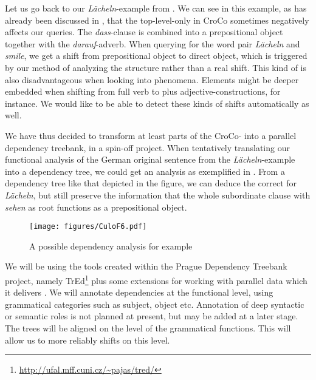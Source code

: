 \documentclass[output=paper]{LSP/langsci}
\begin{document}
Let us go back to our \textit{Lächeln}-example  from . We can see in this example, as has already been discussed in , that the top-level-only  in CroCo sometimes negatively affects our queries. The \textit{dass}-clause is combined into a prepositional object together with the \textit{darauf}-adverb. When querying for the word pair \textit{Lächeln} and \textit{smile}, we get a shift from prepositional object to direct object, which is triggered by our method of analyzing the structure rather than a real shift. This kind of  is also disadvantageous when looking into  phenomena. Elements might be deeper embedded when shifting from full verb to  plus adjective-constructions, for instance. We would like to be able to detect these kinds of shifts automatically as well.

We have thus decided to transform at least parts of the CroCo- into a parallel dependency treebank, in a spin-off project. When tentatively translating our functional analysis of the German original sentence from the \textit{Lächeln}-example into a dependency tree, we could get an analysis as exemplified in . From a dependency tree like that depicted in the figure, we can deduce the correct  for \textit{Lächeln}, but still preserve the information that the whole subordinate clause with \textit{sehen} as root functions as a prepositional object.

\begin{figure} 
\texttt{[image: figures/CuloF6.pdf]}
\caption{A possible dependency analysis for example }
\label{fig:culo:6}
\end{figure}


We will be using the tools created within the Prague Dependency Treebank project, namely TrEd\footnote{\url{http://ufal.mff.cuni.cz/~pajas/tred/}} plus some extensions for working with parallel data which it delivers \citep{BöhmováEtAl2000}. We will annotate dependencies at the functional level, using grammatical categories such as subject, object etc. Annotation of deep syntactic or semantic roles is not planned at present, but may be added at a later stage. The trees will be aligned on the level of the grammatical functions. This  will allow us to more reliably  shifts on this level.



{\sloppy 
\printbibliography[heading=subbibliography,notkeyword=this]
}
\end{document}
